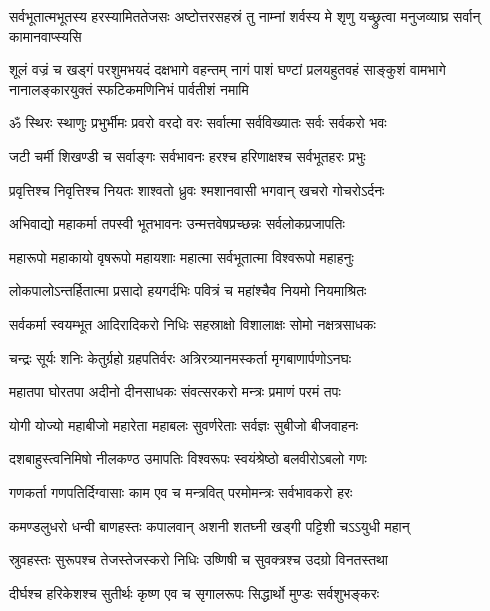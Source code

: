 \threelineshloka
{सर्वभूतात्मभूतस्य हरस्यामिततेजसः}
{अष्टोत्तरसहस्रं तु नाम्नां शर्वस्य मे शृणु}
{यच्छ्रुत्वा मनुजव्याघ्र सर्वान् कामानवाप्स्यसि}%


{शूलं वज्रं च खड्गं परशुमभयदं दक्षभागे वहन्तम्}
{नागं पाशं घण्टां प्रलयहुतवहं साङ्कुशं वामभागे}
{नानालङ्कारयुक्तं स्फटिकमणिनिभं पार्वतीशं नमामि}

\resetShloka
{}
\twolineshloka
{ॐ स्थिरः स्थाणुः प्रभुर्भीमः प्रवरो वरदो वरः}%
{सर्वात्मा सर्वविख्यातः सर्वः सर्वकरो भवः}%

\twolineshloka
{जटी चर्मी शिखण्डी च सर्वाङ्गः सर्वभावनः}%
{हरश्च हरिणाक्षश्च सर्वभूतहरः प्रभुः}%

\twolineshloka
{प्रवृत्तिश्च निवृत्तिश्च नियतः शाश्वतो ध्रुवः}%
{श्मशानवासी भगवान् खचरो गोचरोऽर्दनः}%

\twolineshloka
{अभिवाद्यो महाकर्मा तपस्वी भूतभावनः}%
{उन्मत्तवेषप्रच्छन्नः सर्वलोकप्रजापतिः}%

\twolineshloka
{महारूपो महाकायो वृषरूपो महायशाः}%
{महात्मा सर्वभूतात्मा विश्वरूपो महाहनुः}%

\twolineshloka
{लोकपालोऽन्तर्हितात्मा प्रसादो हयगर्दभिः}%
{पवित्रं च महांश्चैव नियमो नियमाश्रितः}%

\twolineshloka
{सर्वकर्मा स्वयम्भूत आदिरादिकरो निधिः}%
{सहस्राक्षो विशालाक्षः सोमो नक्षत्रसाधकः}%

\twolineshloka
{चन्द्रः सूर्यः शनिः केतुर्ग्रहो ग्रहपतिर्वरः}%
{अत्रिरत्र्यानमस्कर्ता मृगबाणार्पणोऽनघः}%

\twolineshloka
{महातपा घोरतपा अदीनो दीनसाधकः}%
{संवत्सरकरो मन्त्रः प्रमाणं परमं तपः}%

\twolineshloka
{योगी योज्यो महाबीजो महारेता महाबलः}%
{सुवर्णरेताः सर्वज्ञः सुबीजो बीजवाहनः}%

\twolineshloka
{दशबाहुस्त्वनिमिषो नीलकण्ठ उमापतिः}%
{विश्वरूपः स्वयंश्रेष्ठो बलवीरोऽबलो गणः}%

\twolineshloka
{गणकर्ता गणपतिर्दिग्वासाः काम एव च}%
{मन्त्रवित् परमो\hspace{.3ex}मन्त्रः सर्वभावकरो हरः}%

\twolineshloka
{कमण्डलुधरो धन्वी बाणहस्तः कपालवान्}%
{अशनी शतघ्नी खड्गी पट्टिशी चऽऽयुधी महान्}%

\twolineshloka
{स्रुवहस्तः सुरूपश्च तेजस्तेजस्करो निधिः}%
{उष्णिषी च सुवक्त्रश्च उदग्रो विनतस्तथा}%

\twolineshloka
{दीर्घश्च हरिकेशश्च सुतीर्थः कृष्ण एव च}%
{सृगालरूपः सिद्धार्थो मुण्डः सर्वशुभङ्करः}%

